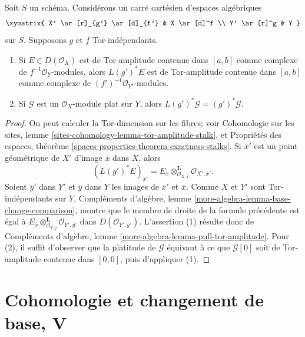 \begin{lemma}
\label{lemma-tor-independence-and-tor-amplitude}
Soit $S$ un sch\'ema. Consid\'erons un carr\'e cart\'esien d'espaces alg\'ebriques
$$
\xymatrix{
X' \ar[r]_{g'} \ar[d]_{f'} & X \ar[d]^f \\
Y' \ar[r]^g & Y
}
$$
sur $S$. Supposons $g$ et $f$ Tor-ind\'ependants.
\begin{enumerate}
\item Si $E\in D(\mathcal{O}_X)$ est de Tor-amplitude contenue dans $[a,b]$
comme complexe de $f^{-1}\mathcal{O}_Y$-modules, alors $L(g')^*E$ est de
Tor-amplitude contenue dans $[a,b]$ comme complexe de
$(f')^{-1}\mathcal{O}_{Y'}$-modules.
\item Si $\mathcal{G}$ est un $\mathcal{O}_X$-module plat sur $Y$, alors
$L(g')^*\mathcal{G}=(g')^*\mathcal{G}$.
\end{enumerate}
\end{lemma}

\begin{proof}
On peut calculer la Tor-dimension sur les fibres; voir Cohomologie sur les
sites, lemme \ref{sites-cohomology-lemma-tor-amplitude-stalk}, et Propri\'et\'es
des espaces, th\'eor\`eme \ref{spaces-properties-theorem-exactness-stalks}.
Si $\overline{x}'$ est un point g\'eom\'etrique de $X'$ d'image $\overline x$
dans $X$, alors
$$
(L(g')^*E)_{\overline{x}'} =
E_{\overline{x}}
\otimes_{\mathcal{O}_{X, \overline{x}}}^\mathbf{L}
\mathcal{O}_{X', \overline{x}'}.
$$
Soient $\overline y'$ dans $Y'$ et $\overline y$ dans $Y$ les images de
$\overline x'$ et $\overline x$. Comme $X$ et $Y'$ sont Tor-ind\'ependants sur
$Y$, Compl\'ements d'alg\`ebre, lemme
\ref{more-algebra-lemma-base-change-comparison}, montre que le membre de droite
de la formule pr\'ec\'edente est \'egal \`a
$E_{\overline{x}}
\otimes_{\mathcal{O}_{Y, \overline{y}}}^\mathbf{L}
\mathcal{O}_{Y', \overline{y}'}$
dans $D(\mathcal{O}_{Y',\overline y'})$. L'assertion (1) r\'esulte donc de
Compl\'ements d'alg\`ebre, lemme
\ref{more-algebra-lemma-pull-tor-amplitude}. Pour (2), il suffit d'observer que
la platitude de $\mathcal G$ \'equivaut \`a ce que $\mathcal G[0]$ soit de
Tor-amplitude contenue dans $[0,0]$, puis d'appliquer (1).
\end{proof}

\section{Cohomologie et changement de base, V}
\label{section-cohomology-base-change}

